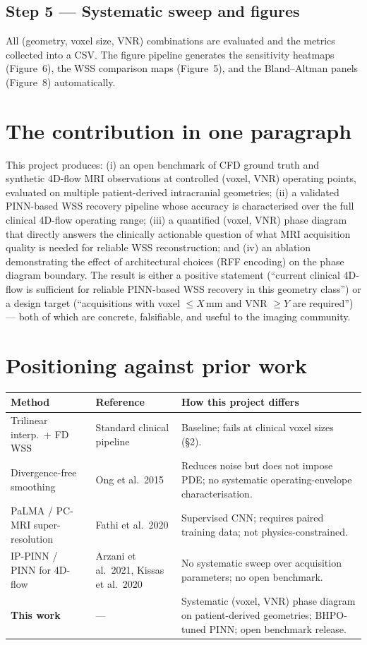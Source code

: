 \documentclass[11pt]{article}
\begin{document}
\subsection*{Step 5 — Systematic sweep and figures}
All (geometry, voxel size, VNR) combinations are evaluated and the metrics collected
into a CSV.  The figure pipeline generates the sensitivity heatmaps (Figure~6), the WSS
comparison maps (Figure~5), and the Bland--Altman panels (Figure~8) automatically.

\section{The contribution in one paragraph}

This project produces: (i) an open benchmark of CFD ground truth and synthetic 4D-flow
MRI observations at controlled (voxel, VNR) operating points, evaluated on multiple
patient-derived intracranial geometries; (ii) a validated PINN-based WSS recovery
pipeline whose accuracy is characterised over the full clinical 4D-flow operating
range; (iii) a quantified (voxel, VNR) phase diagram that directly answers the
clinically actionable question of what MRI acquisition quality is needed for
reliable WSS reconstruction; and (iv) an ablation demonstrating the effect of
architectural choices (RFF encoding) on the phase diagram boundary.  The result is
either a positive statement (``current clinical 4D-flow is sufficient for reliable
PINN-based WSS recovery in this geometry class'') or a design target (``acquisitions
with voxel $\leq X$\,mm and VNR $\geq Y$ are required'') — both of which are
concrete, falsifiable, and useful to the imaging community.

\section{Positioning against prior work}

\begin{tabularx}{\textwidth}{l l X}
\toprule
\textbf{Method} & \textbf{Reference} & \textbf{How this project differs} \\
\midrule
Trilinear interp.\ + FD WSS
  & Standard clinical pipeline
  & Baseline; fails at clinical voxel sizes (§2). \\[4pt]
Divergence-free smoothing
  & Ong et al.\ 2015
  & Reduces noise but does not impose PDE;
    no systematic operating-envelope characterisation. \\[4pt]
PaLMA / PC-MRI super-resolution
  & Fathi et al.\ 2020
  & Supervised CNN; requires paired training data;
    not physics-constrained. \\[4pt]
IP-PINN / PINN for 4D-flow
  & Arzani et al.\ 2021,
    Kissas et al.\ 2020
  & No systematic sweep over acquisition parameters;
    no open benchmark. \\[4pt]
\textbf{This work}
  & ---
  & Systematic (voxel, VNR) phase diagram on patient-derived geometries;
    BHPO-tuned PINN; open benchmark release. \\
\bottomrule
\end{tabularx}
\end{document}
